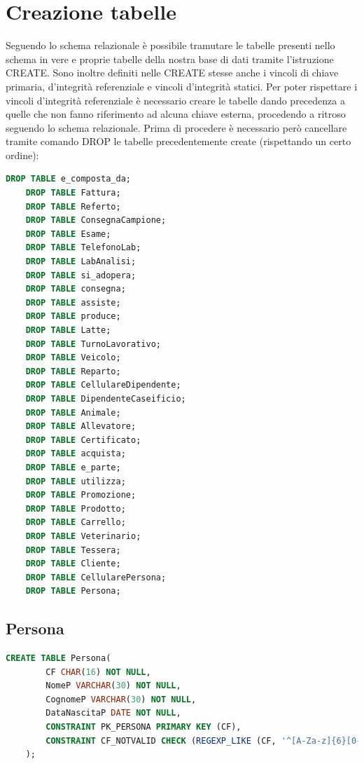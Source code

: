 \documentclass[12pt]{report}
\begin{document}
\section{Creazione tabelle}
Seguendo lo schema relazionale è possibile tramutare le tabelle presenti nello schema in vere e proprie tabelle della nostra base di dati tramite l'istruzione CREATE. Sono inoltre definiti nelle CREATE stesse anche i vincoli di chiave primaria, d'integrità referenziale e vincoli d'integrità statici. Per poter rispettare i vincoli d'integrità referenziale è necessario creare le tabelle dando precedenza a quelle che non fanno riferimento ad alcuna chiave esterna, procedendo a ritroso seguendo lo schema relazionale. Prima di procedere è necessario però cancellare tramite comando DROP le tabelle precedentemente create (rispettando un certo ordine):

\begin{lstlisting}[language=SQL,caption={DROP\_TABELLE}]
    DROP TABLE e_composta_da;
    DROP TABLE Fattura;
    DROP TABLE Referto;
    DROP TABLE ConsegnaCampione;
    DROP TABLE Esame;
    DROP TABLE TelefonoLab;
    DROP TABLE LabAnalisi;
    DROP TABLE si_adopera;
    DROP TABLE consegna;
    DROP TABLE assiste;
    DROP TABLE produce;
    DROP TABLE Latte;
    DROP TABLE TurnoLavorativo;
    DROP TABLE Veicolo;
    DROP TABLE Reparto;
    DROP TABLE CellulareDipendente;
    DROP TABLE DipendenteCaseificio;
    DROP TABLE Animale;
    DROP TABLE Allevatore;
    DROP TABLE Certificato;
    DROP TABLE acquista;
    DROP TABLE e_parte;
    DROP TABLE utilizza;
    DROP TABLE Promozione;
    DROP TABLE Prodotto;    
    DROP TABLE Carrello; 
    DROP TABLE Veterinario;
    DROP TABLE Tessera;
    DROP TABLE Cliente;
    DROP TABLE CellularePersona;
    DROP TABLE Persona;
\end{lstlisting}

\subsection*{Persona}
\begin{lstlisting}[language=SQL,caption={CREA\_TABELLE}]
    CREATE TABLE Persona(
        CF CHAR(16) NOT NULL, 
        NomeP VARCHAR(30) NOT NULL,
        CognomeP VARCHAR(30) NOT NULL,
        DataNascitaP DATE NOT NULL,
        CONSTRAINT PK_PERSONA PRIMARY KEY (CF),
        CONSTRAINT CF_NOTVALID CHECK (REGEXP_LIKE (CF, '^[A-Za-z]{6}[0-9]{2}[A-Za-z]{1}[0-9]{2}[A-Za-z]{1}[0-9]{3}[A-Za-z]{1}$'))
    );
\end{lstlisting}
\end{document}
